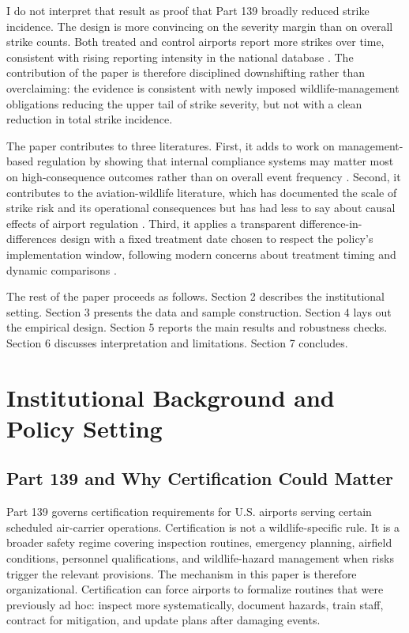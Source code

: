 \documentclass[12pt]{article}
\begin{document}
I do not interpret that result as proof that Part 139 broadly reduced strike incidence. The design is more convincing on the severity margin than on overall strike counts. Both treated and control airports report more strikes over time, consistent with rising reporting intensity in the national database \citep{faa_wildlife_db_2024}. The contribution of the paper is therefore disciplined downshifting rather than overclaiming: the evidence is consistent with newly imposed wildlife-management obligations reducing the upper tail of strike severity, but not with a clean reduction in total strike incidence.

The paper contributes to three literatures. First, it adds to work on management-based regulation by showing that internal compliance systems may matter most on high-consequence outcomes rather than on overall event frequency \citep{Coglianese_2003}. Second, it contributes to the aviation-wildlife literature, which has documented the scale of strike risk and its operational consequences but has had less to say about causal effects of airport regulation \citep{Burger_1985,Washburn_2013,Altringer_2022,Altringer_2023}. Third, it applies a transparent difference-in-differences design with a fixed treatment date chosen to respect the policy's implementation window, following modern concerns about treatment timing and dynamic comparisons \citep{Callaway_2021,Sun_2021,Goodman_Bacon_2021}.

The rest of the paper proceeds as follows. Section 2 describes the institutional setting. Section 3 presents the data and sample construction. Section 4 lays out the empirical design. Section 5 reports the main results and robustness checks. Section 6 discusses interpretation and limitations. Section 7 concludes.

\section{Institutional Background and Policy Setting}

\subsection{Part 139 and Why Certification Could Matter}

Part 139 governs certification requirements for U.S. airports serving certain scheduled air-carrier operations. Certification is not a wildlife-specific rule. It is a broader safety regime covering inspection routines, emergency planning, airfield conditions, personnel qualifications, and wildlife-hazard management when risks trigger the relevant provisions. The mechanism in this paper is therefore organizational. Certification can force airports to formalize routines that were previously ad hoc: inspect more systematically, document hazards, train staff, contract for mitigation, and update plans after damaging events.
\end{document}
